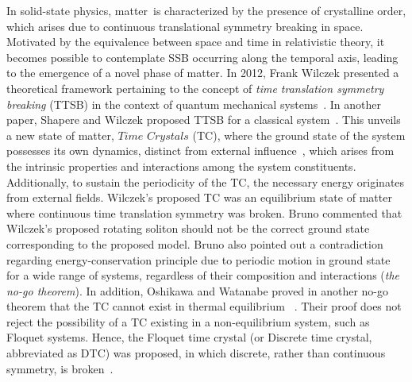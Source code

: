 \documentclass[%
nofootinbib,
reprint,
superscriptaddress,
amsmath,amssymb,showkeys,
aps,
prb,
]{revtex4-2}
\begin{document}
In solid-state physics, matter is characterized by the presence of crystalline order, which arises due to continuous translational symmetry breaking in space. Motivated by the equivalence between space and time in relativistic theory, it becomes possible to contemplate SSB occurring along the temporal axis, leading to the emergence of a novel phase of matter. In 2012, Frank Wilczek presented a theoretical framework pertaining to the concept of \textit{time translation symmetry breaking} (TTSB) in the context of quantum mechanical systems~\cite{wilczek_quantum_2012}. In another paper, Shapere and Wilczek proposed TTSB for a classical system~\cite{shapere_classical_2012}. This unveils a new state of matter, $\textit{Time Crystals}$ (TC), where the ground state of the system possesses its own dynamics, distinct from external influence~\cite{wilczek_quantum_2012}, which arises from the intrinsic properties and interactions among the system constituents. Additionally, to sustain the periodicity of the TC, the necessary energy originates from external fields. Wilczek's proposed TC was an equilibrium state of matter where continuous time translation symmetry was broken. {Bruno commented that Wilczek's proposed rotating soliton should not be the correct ground state  corresponding to the proposed model\cite{Bruno_comment_1}. Bruno also pointed out a contradiction regarding energy-conservation principle due to periodic motion in ground state for a wide range of systems, regardless of their composition and interactions (\textit{the no-go theorem})\cite{Bruno2013}. In addition}, Oshikawa and Watanabe proved {in another no-go theorem} that the TC cannot exist in thermal equilibrium  ~\cite{watanabe_absence_2015}. Their proof does not reject the possibility of a TC  existing in a non-equilibrium system, such as Floquet systems. Hence, the Floquet time crystal (or Discrete time crystal, abbreviated as DTC) was proposed, in which discrete, rather than continuous symmetry, is broken~\cite{else_floquet_2016}.
\end{document}
